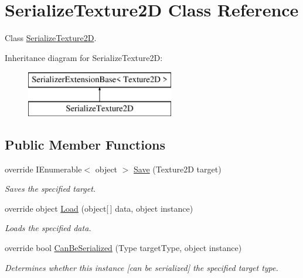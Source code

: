 \hypertarget{class_serialize_texture2_d}{}\section{Serialize\+Texture2D Class Reference}
\label{class_serialize_texture2_d}


Class \hyperlink{class_serialize_texture2_d}{Serialize\+Texture2D}.  


Inheritance diagram for Serialize\+Texture2D\+:\begin{figure}[H]
\begin{center}
\leavevmode
\includegraphics[height=2.000000cm]{class_serialize_texture2_d}
\end{center}
\end{figure}
\subsection*{Public Member Functions}
\begin{DoxyCompactItemize}
\item 
override I\+Enumerable$<$ object $>$ \hyperlink{class_serialize_texture2_d_aa2fd3c70876658476e1411bb13ac5966}{Save} (Texture2D target)
\begin{DoxyCompactList}\small\item\em Saves the specified target. \end{DoxyCompactList}\item 
override object \hyperlink{class_serialize_texture2_d_a769620049aa1f3f3f7ff17f6cacd74a1}{Load} (object\mbox{[}$\,$\mbox{]} data, object instance)
\begin{DoxyCompactList}\small\item\em Loads the specified data. \end{DoxyCompactList}\item 
override bool \hyperlink{class_serialize_texture2_d_a4485a35955c52146f174efa44317787e}{Can\+Be\+Serialized} (Type target\+Type, object instance)
\begin{DoxyCompactList}\small\item\em Determines whether this instance \mbox{[}can be serialized\mbox{]} the specified target type. \end{DoxyCompactList}\end{DoxyCompactItemize}


